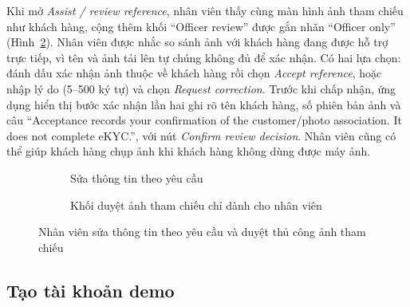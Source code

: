 Khi mở \textit{Assist / review reference}, nhân viên thấy cùng màn hình ảnh tham chiếu như khách hàng, cộng thêm khối ``Officer review'' được gắn nhãn ``Officer only'' (Hình~\ref{fig:ch4-officer-review}). Nhân viên được nhắc so sánh ảnh với khách hàng đang được hỗ trợ trực tiếp, vì tên và ảnh tải lên tự chúng không đủ để xác nhận. Có hai lựa chọn: đánh dấu xác nhận ảnh thuộc về khách hàng rồi chọn \textit{Accept reference}, hoặc nhập lý do (5--500 ký tự) và chọn \textit{Request correction}. Trước khi chấp nhận, ứng dụng hiển thị bước xác nhận lần hai ghi rõ tên khách hàng, số phiên bản ảnh và câu ``Acceptance records your confirmation of the customer/photo association. It does not complete eKYC.'', với nút \textit{Confirm review decision}. Nhân viên cũng có thể giúp khách hàng chụp ảnh khi khách hàng không dùng được máy ảnh.

\begin{figure}[H]
\centering
\begin{subfigure}[t]{0.4\textwidth}
  \centering
  \caption{Sửa thông tin theo yêu cầu}
  \label{fig:ch4-officer-edit-form}
\end{subfigure}\hspace{0.05\textwidth}%
\begin{subfigure}[t]{0.4\textwidth}
  \centering
  \caption{Khối duyệt ảnh tham chiếu chỉ dành cho nhân viên}
  \label{fig:ch4-officer-review}
\end{subfigure}
\caption{Nhân viên sửa thông tin theo yêu cầu và duyệt thủ công ảnh tham chiếu}
\label{fig:ch4-officer-edit}
\end{figure}

\subsection{Tạo tài khoản demo}
\label{sec:ch4-officer-demo-account}

